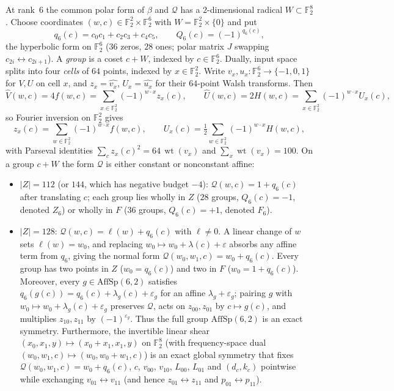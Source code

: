 \documentclass[11pt]{article}
\theoremstyle{definition}
\theoremstyle{remark}
\newcommand{\F}{\mathbb{F}}
\newcommand{\wt}{\operatorname{wt}}
\DeclareRobustCommand{\_}{\textunderscore\allowbreak}
\begin{document}
At rank~$6$ the common polar form of $\beta$ and $\mathcal Q$ has a $2$-dimensional radical $W\subset\F_2^8$. Choose coordinates $(w,c)\in\F_2^2\times\F_2^6$ with $W=\F_2^2\times\{0\}$ and put
\[
  q_6(c)=c_0c_1+c_2c_3+c_4c_5,\qquad Q_6(c)=(-1)^{q_6(c)},
\]
the hyperbolic form on $\F_2^6$ ($36$ zeros, $28$ ones; polar matrix $J$ swapping $c_{2i}\leftrightarrow c_{2i+1}$). A \emph{group} is a coset $c+W$, indexed by $c\in\F_2^6$. Dually, input space splits into four \emph{cells} of $64$ points, indexed by $x\in\F_2^2$. Write $v_x,u_x:\F_2^6\to\{-1,0,1\}$ for $V,U$ on cell $x$, and $z_x=\widehat{v_x}$, $U_x=\widehat{u_x}$ for their $64$-point Walsh transforms. Then
\[
  \widehat V(w,c)=4f(w,c)=\sum_{x\in\F_2^2}(-1)^{w\cdot x}z_x(c),\qquad
  \widehat U(w,c)=2H(w,c)=\sum_{x\in\F_2^2}(-1)^{w\cdot x}U_x(c),
\]
so Fourier inversion on $\F_2^2$ gives
\[
  z_x(c)=\sum_{w\in\F_2^2}(-1)^{w\cdot x}f(w,c),\qquad
  U_x(c)=\tfrac12\sum_{w\in\F_2^2}(-1)^{w\cdot x}H(w,c),
\]
with Parseval identities $\sum_c z_x(c)^2=64\,\wt(v_x)$ and $\sum_x\wt(v_x)=100$. On a group $c+W$ the form $\mathcal Q$ is either constant or nonconstant affine:
\begin{itemize}[nosep]
\item $|Z|=112$ (or $144$, which has negative budget $-4$): $\mathcal Q(w,c)=1+q_6(c)$ after translating $c$; each group lies wholly in $Z$ ($28$ groups, $Q_6(c)=-1$, denoted $Z_6$) or wholly in $F$ ($36$ groups, $Q_6(c)=+1$, denoted $F_6$).
\item $|Z|=128$: $\mathcal Q(w,c)=\ell(w)+q_6(c)$ with $\ell\neq0$. A linear change of $w$ sets $\ell(w)=w_0$, and replacing $w_0\mapsto w_0+\lambda(c)+\varepsilon$ absorbs any affine term from $q_6$, giving the normal form $\mathcal Q(w_0,w_1,c)=w_0+q_6(c)$. Every group has two points in $Z$ ($w_0=q_6(c)$) and two in $F$ ($w_0=1+q_6(c)$). Moreover, every $g\in\mathrm{AffSp}(6,2)$ satisfies $q_6(g(c))=q_6(c)+\lambda_g(c)+\varepsilon_g$ for an affine $\lambda_g+\varepsilon_g$; pairing $g$ with $w_0\mapsto w_0+\lambda_g(c)+\varepsilon_g$ preserves $\mathcal Q$, acts on $z_{00},z_{01}$ by $c\mapsto g(c)$, and multiplies $z_{10},z_{11}$ by $(-1)^{\varepsilon_g}$. Thus the full group $\mathrm{AffSp}(6,2)$ is an exact symmetry. Furthermore, the invertible linear shear $(x_0,x_1,y)\mapsto(x_0+x_1,x_1,y)$ on $\F_2^8$ (with frequency-space dual $(w_0,w_1,c)\mapsto(w_0,w_0+w_1,c)$) is an exact global symmetry that fixes $\mathcal Q(w_0,w_1,c)=w_0+q_6(c)$, $c$, $v_{00}$, $v_{10}$, $L_{00}$, $L_{01}$ and $(d_c,k_c)$ pointwise while exchanging $v_{01}\leftrightarrow v_{11}$ (and hence $z_{01}\leftrightarrow z_{11}$ and $p_{01}\leftrightarrow p_{11}$).
\end{itemize}
\end{document}
